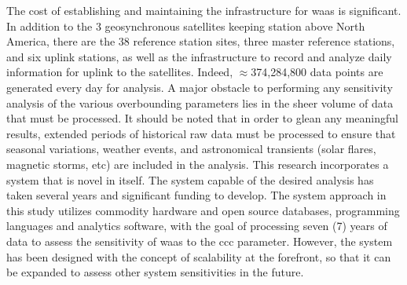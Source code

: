 
The cost of establishing and maintaining the infrastructure for \ac{waas} is significant.  In addition to the 3 geosynchronous satellites keeping station above North America, there are the 38 reference station sites, three master reference stations, and six uplink stations, as well as the infrastructure to record and analyze daily information for uplink to the satellites.  Indeed, $\approx$374,284,800 data points are generated every day for analysis.  A major obstacle to performing any sensitivity analysis of the various overbounding parameters lies in the sheer volume of data that must be processed.  It should be noted that in order to glean any meaningful results, extended periods of historical raw data must be processed to ensure that seasonal variations, weather events, and astronomical transients (solar flares, magnetic storms, etc) are included in the analysis.  This research incorporates a system that is novel in itself.  The system capable of the desired analysis has taken several years and significant funding to develop. The system approach in this study utilizes commodity hardware and open source databases, programming languages and analytics software, with the goal of processing seven (7) years of data to assess the sensitivity of \ac{waas} to the \ac{ccc} parameter.  However, the system has been designed with the concept of scalability at the forefront, so that it can be expanded to assess other system sensitivities in the future.


